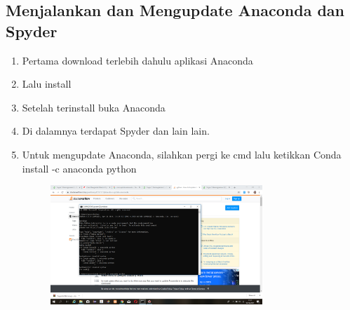 \documentclass{article}
\begin{document}
\subsection{Menjalankan dan Mengupdate Anaconda dan Spyder}
\begin{enumerate}
    \item Pertama download terlebih dahulu aplikasi Anaconda
    \item Lalu install
    \item Setelah terinstall buka Anaconda
    \item Di dalamnya terdapat Spyder dan lain lain.
    \item Untuk mengupdate Anaconda, silahkan pergi ke cmd lalu ketikkan Conda install -c anaconda python
        \begin{figure}[h]
            \centerline{\includegraphics[width=8cm]{image/anacondaupdt.png}}
        \end{figure}
\end{enumerate}
\newpage
\end{document}
